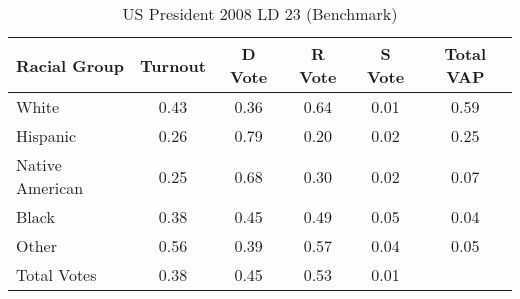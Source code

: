 \begin{table}[htb]
\begin{center}
\caption{US President 2008 LD 23 (Benchmark)}
\label{pres08_vap_ld_23_benchmark}
\begin{tabular}{lccccc}
  \hline
Racial Group & Turnout & D Vote & R Vote & S Vote & Total VAP \\ 
  \hline
White & 0.43 & 0.36 & 0.64 & 0.01 & 0.59 \\ 
  Hispanic & 0.26 & 0.79 & 0.20 & 0.02 & 0.25 \\ 
  Native American & 0.25 & 0.68 & 0.30 & 0.02 & 0.07 \\ 
  Black & 0.38 & 0.45 & 0.49 & 0.05 & 0.04 \\ 
  Other & 0.56 & 0.39 & 0.57 & 0.04 & 0.05 \\ 
  Total Votes & 0.38 & 0.45 & 0.53 & 0.01 &  \\ 
   \hline
\end{tabular}
\end{center}
\end{table}
